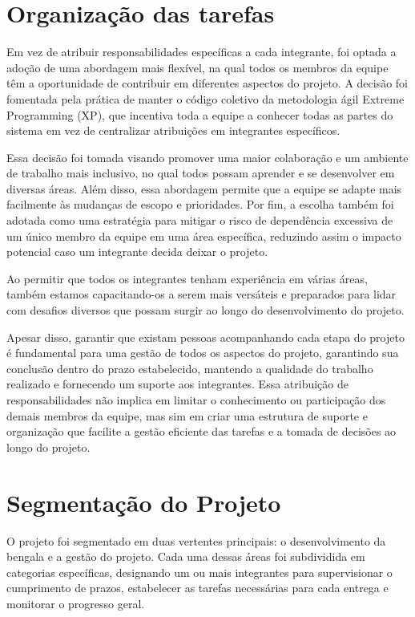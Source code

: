     \section{Organização das tarefas}
    Em vez de atribuir responsabilidades específicas a cada integrante, foi optada a adoção de uma abordagem mais flexível, na qual todos os membros da equipe têm a oportunidade de contribuir em diferentes aspectos do projeto. A decisão foi fomentada pela prática de manter o código coletivo da metodologia ágil Extreme Programming (XP), que incentiva toda a equipe a conhecer todas as partes do sistema em vez de centralizar atribuições em integrantes específicos.

    Essa decisão foi tomada visando promover uma maior colaboração e um ambiente de trabalho mais inclusivo, no qual todos possam aprender e se desenvolver em diversas áreas. Além disso, essa abordagem permite que a equipe se adapte mais facilmente às mudanças de escopo e prioridades. Por fim, a escolha também foi adotada como uma estratégia para mitigar o risco de dependência excessiva de um único membro da equipe em uma área específica, reduzindo assim o impacto potencial caso um integrante decida deixar o projeto. 
    
    Ao permitir que todos os integrantes tenham experiência em várias áreas, também estamos capacitando-os a serem mais versáteis e preparados para lidar com desafios diversos que possam surgir ao longo do desenvolvimento do projeto.
    
    Apesar disso, garantir que existam pessoas acompanhando cada etapa do projeto é fundamental para uma gestão de todos os aspectos do projeto, garantindo sua conclusão dentro do prazo estabelecido, mantendo a qualidade do trabalho realizado e fornecendo um suporte aos integrantes. Essa atribuição de responsabilidades não implica em limitar o conhecimento ou participação dos demais membros da equipe, mas sim em criar uma estrutura de suporte e organização que facilite a gestão eficiente das tarefas e a tomada de decisões ao longo do projeto.


    \section{Segmentação do Projeto}
    O projeto foi segmentado em duas vertentes principais: o desenvolvimento da bengala e a gestão do projeto. Cada uma dessas áreas foi subdividida em categorias específicas, designando um ou mais integrantes para supervisionar o cumprimento de prazos, estabelecer as tarefas necessárias para cada entrega e monitorar o progresso geral.

